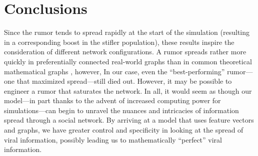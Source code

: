\section{Conclusions}
\label{sec:conclusions}
Since the rumor tends to spread rapidly at the start of the simulation (resulting in a corresponding boost in the stifler population), these results inspire the consideration of different network configurations.  A rumor spreads rather more quickly in preferentially connected real-world graphs than in common theoretical mathematical graphs \cite{doerr-2012}, however, In our case, even the ``best-performing'' rumor---one that maximized spread---still died out. However, it may be possible to engineer a rumor that saturates the network.
In all, it would seem as though our model---in part thanks to the advent of increased computing power for simulations---can begin to unravel the nuances and intricacies of information spread through a social network. By arriving at a model that uses feature vectors and graphs, we have greater control and specificity in looking at the spread of viral information, possibly leading us to mathematically ``perfect'' viral information.
